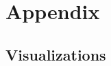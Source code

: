 \documentclass[letterpaper]{article}
\begin{document}
\section*{Appendix}
\label{sec:appendix}
\subsection*{Visualizations}





\end{document}
